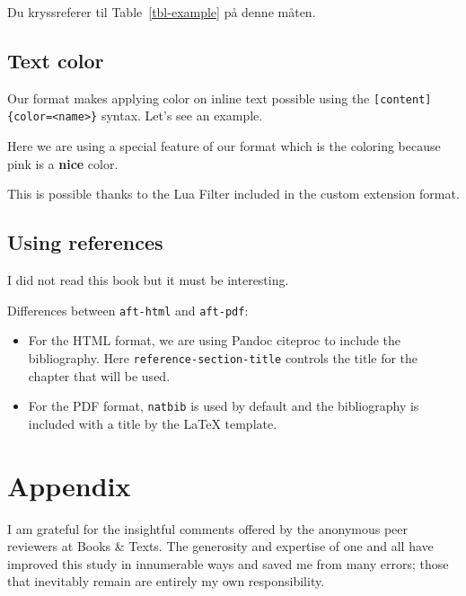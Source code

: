 \documentclass[
  10pt,
]{scrartcl}
\providecommand{\tightlist}{%
  \setlength{\itemsep}{0pt}\setlength{\parskip}{0pt}}\usepackage{longtable,booktabs,array}
\begin{document}
Du kryssreferer til Table~\ref{tbl-example} på denne måten.

\subsection{Text color}\label{sec-summary}

Our format makes applying color on inline text possible using the
\texttt{{[}content{]}\{color=\textless{}name\textgreater{}\}} syntax.
Let's see an example.

Here we are using a special feature of our format which is the coloring
because \textcolor{mypink}{pink is a \textbf{nice} color}.

This is possible thanks to the Lua Filter included in the custom
extension format.

\subsection*{Using references}\label{using-references}

I did not read this book but it must be interesting.

Differences between \texttt{aft-html} and \texttt{aft-pdf}:

\begin{itemize}
\tightlist
\item
  For the HTML format, we are using Pandoc citeproc to include the
  bibliography. Here \texttt{reference-section-title} controls the title
  for the chapter that will be used.
\item
  For the PDF format, \texttt{natbib} is used by default and the
  bibliography is included with a title by the LaTeX template.
\end{itemize}

\section*{Appendix}\label{appendix}

I am grateful for the insightful comments offered by the anonymous peer
reviewers at Books \& Texts. The generosity and expertise of one and all
have improved this study in innumerable ways and saved me from many
errors; those that inevitably remain are entirely my own responsibility.


\newpage
{}
\renewcommand{\refname}{Referanser} %
\renewcommand{\bibname}{Referanser} %

\end{document}
